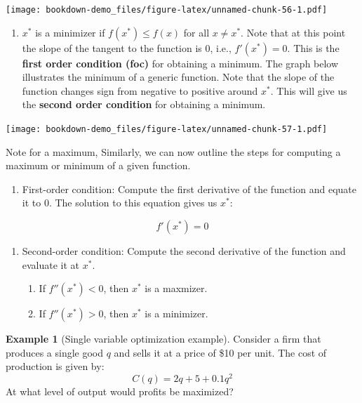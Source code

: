 \documentclass[
]{book}
\providecommand{\tightlist}{%
  \setlength{\itemsep}{0pt}\setlength{\parskip}{0pt}}
\theoremstyle{definition}
\theoremstyle{definition}
\newtheorem{example}{Example}[chapter]
\theoremstyle{definition}
\theoremstyle{definition}
\theoremstyle{remark}
\begin{document}
\texttt{[image: bookdown-demo\_files/figure-latex/unnamed-chunk-56-1.pdf]}

\begin{enumerate}
\def\labelenumi{\arabic{enumi}.}
\setcounter{enumi}{1}
\tightlist
\item
  \(x^*\) is a minimizer if \(f(x^*)\leq f(x)\) for all \(x\neq x^*\). Note that at this point the slope of the tangent to the function is \(0\), i.e., \(f'(x^*)=0\). This is the \textbf{first order condition (foc)} for obtaining a minimum. The graph below illustrates the minimum of a generic function. Note that the slope of the function changes sign from negative to positive around \(x^*\). This will give us the \textbf{second order condition} for obtaining a minimum.
\end{enumerate}

\texttt{[image: bookdown-demo\_files/figure-latex/unnamed-chunk-57-1.pdf]}

Note for a maximum, Similarly, we can now outline the steps for computing a maximum or minimum of a given function.

\begin{enumerate}
\def\labelenumi{\arabic{enumi}.}
\tightlist
\item
  First-order condition: Compute the first derivative of the function and equate it to 0. The solution to this equation gives us \(x^*\):
\end{enumerate}

\[ f'(x^*) = 0\]

\begin{enumerate}
\def\labelenumi{\arabic{enumi}.}
\setcounter{enumi}{1}
\item
  Second-order condition: Compute the second derivative of the function and evaluate it at \(x^*\).

  \begin{enumerate}
  \def\labelenumii{\alph{enumii}.}
  \item
    If \(f''(x^*) < 0\), then \(x^*\) is a maxmizer.
  \item
    If \(f''(x^*) > 0\), then \(x^*\) is a minimizer.
  \end{enumerate}
\end{enumerate}

\begin{example}[Single variable optimization example]
\protect\hypertarget{exm:unnamed-chunk-58}{}\label{exm:unnamed-chunk-58}Consider a firm that produces a single good \(q\) and sells it at a price of \$10 per unit. The cost of production is given by:
\[C(q)=2q+ 5+0.1q^2\]
At what level of output would profits be maximized?
\end{example}
\end{document}
